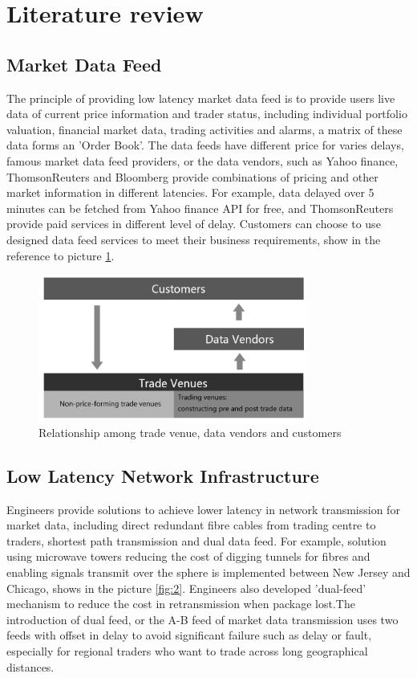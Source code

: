 \documentclass[11pt,openright,a4paper]{report}
\begin{document}
\begin{table}[]
\begin{tabular}{@{}l|l@{}}
	\end{tabular}
\end{table}
\section{Literature review}
\subsection{Market Data Feed}
The principle of providing low latency market data feed is to provide users live data of current price information and trader status, including individual portfolio valuation, financial market data, trading activities and alarms, a matrix of these data forms an 'Order Book'. The data feeds have different price for varies delays, famous market data feed providers, or the data vendors, such as Yahoo finance, ThomsonReuters and Bloomberg provide combinations of pricing and other market information in different latencies. For example, data delayed over 5 minutes can be fetched from Yahoo finance API for free\cite{financeyahoo}, and ThomsonReuters provide paid services in different level of delay. Customers can choose to use designed data feed services to meet their business requirements, show in the reference to picture \ref{fig:1}.\\
\begin{figure}[htbp] 
\centering\includegraphics[width=3.5in]{picture/tradevenue.PNG} 
\caption{Relationship among trade venue, data vendors and customers}
\label{fig:1} 
\end{figure} 
\subsection{Low Latency Network Infrastructure}
Engineers provide solutions to achieve lower latency in network transmission for market data, including direct redundant fibre cables from trading centre to traders, shortest path transmission and dual data feed. For example, solution using microwave towers reducing the cost of digging tunnels for fibres and enabling signals transmit over the sphere is implemented between New Jersey and Chicago\cite{htfbackyard}, shows in the picture \ref{fig:2}. Engineers also developed 'dual-feed' mechanism to reduce the cost in retransmission when package lost\cite{zusman1999fault}.The introduction of dual feed, or the A-B feed of market data transmission uses two feeds with offset in delay to avoid significant failure such as delay or fault, especially for regional traders who want to trade across long geographical distances. \\
\end{document}
